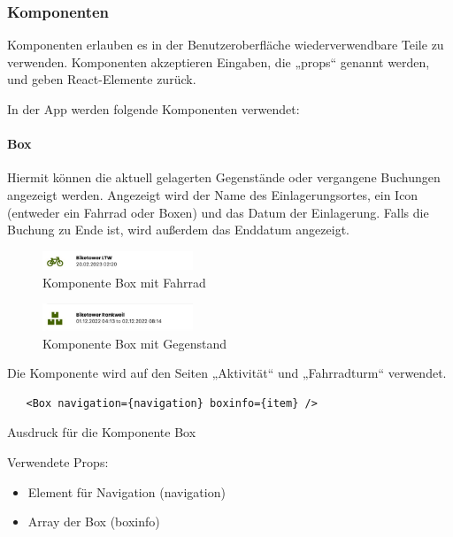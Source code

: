 \subsubsection{Komponenten}
Komponenten erlauben es in der Benutzeroberfläche wiederverwendbare Teile zu verwenden. Komponenten akzeptieren Eingaben, die „props“ genannt werden, und geben React-Elemente zurück. 


In der App werden folgende Komponenten verwendet:

\paragraph{Box}

Hiermit können die aktuell gelagerten Gegenstände oder vergangene Buchungen angezeigt werden. Angezeigt wird der Name des Einlagerungsortes, ein Icon (entweder ein Fahrrad oder Boxen) und das Datum der Einlagerung. Falls die Buchung zu Ende ist, wird außerdem das Enddatum angezeigt.\\

\begin{figure}[H]
  \centering
  \includegraphics[width=0.4\textwidth]{images/app-screenshots/boxwithbike.png}
  \caption{Komponente Box mit Fahrrad}
  \label{fig:boxwithbike}
\end{figure}
\begin{figure}[H]
  \centering
  \includegraphics[width=0.4\textwidth]{images/app-screenshots/boxwithitem.png}
  \caption{Komponente Box mit Gegenstand}
  \label{fig:boxwithitem}
\end{figure}

Die Komponente wird auf den Seiten „Aktivität“ und „Fahrradturm“ verwendet.\\

\begin{listing}[H]
\begin{verbatim}
   <Box navigation={navigation} boxinfo={item} />
\end{verbatim}
  \caption{Ausdruck für die Komponente Box}
  \label{lst:jsxbox}
\end{listing}

Verwendete Props:
\begin{itemize}
  \item Element für Navigation (navigation)
  \item Array der Box (boxinfo)
\end{itemize}

